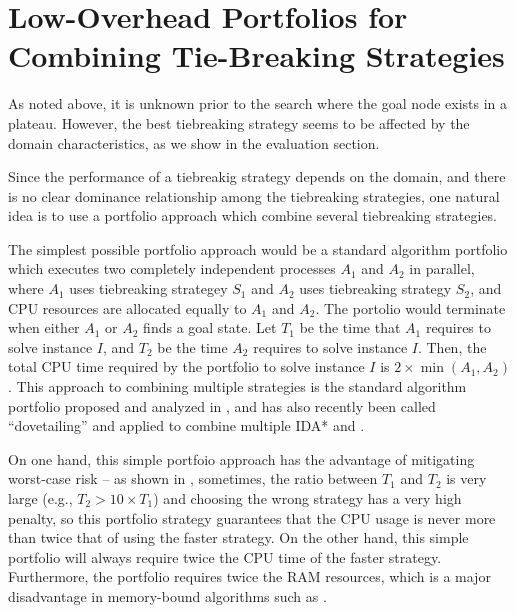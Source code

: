 %  

\section{Low-Overhead Portfolios for Combining Tie-Breaking Strategies}

As noted above, it is unknown prior to the search where the goal node
exists in a plateau.
However, the best tiebreaking strategy seems to be affected by the domain
characteristics, as we show in the evaluation section.

Since the performance of a tiebreakig strategy depends on the domain, and there is no clear dominance relationship among the tiebreaking strategies, one natural 
idea is to use a portfolio approach which combine several tiebreaking strategies.

The simplest possible portfolio approach would be a standard algorithm portfolio
which executes two completely independent \astar processes $A_1$ and $A_2$ in parallel, where $A_1$ uses tiebreaking strategey $S_1$ and $A_2$ uses tiebreaking strategy $S_2$, and CPU resources are allocated equally to $A_1$ and $A_2$.
The portolio would terminate when either $A_1$ or $A_2$ finds a goal state.
Let $T_1$ be the time that $A_1$ requires to solve instance $I$, and $T_2$ be the
time $A_2$ requires to solve instance $I$. Then, the total CPU time
required by the portfolio to solve instance $I$ is $2\times\min(A_1,A_2)$. This approach to combining multiple strategies is the standard algorithm portfolio proposed and analyzed in \cite{HubermanLH97,GomesS01}, and has also recently been called ``dovetailing'' and applied to combine multiple IDA* and \astar  \cite{ValenzanoSSBK10}. %

On one hand, this simple portfoio approach has the advantage of mitigating worst-case risk -- as shown in , sometimes, the ratio between $T_1$ and $T_2$ is very large (e.g., $T_2 > 10\times T_1$) and choosing the wrong strategy has a very high penalty, so this portfolio strategy guarantees that the CPU usage is never more than twice that of using the faster strategy.
On the other hand, this simple portfolio will always require twice the CPU time of the faster strategy. Furthermore, the portfolio requires twice the RAM resources, which is a major disadvantage in memory-bound algorithms such as \astar.

